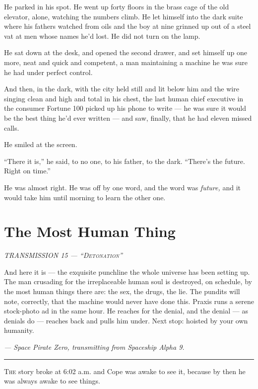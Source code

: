 \documentclass[11pt,openany]{book}
\newcommand{\transheader}{\normalfont\footnotesize\scshape\letterspace}
\newcommand{\letterspace}{}
\newenvironment{transmission}{%
  \par\vspace{0.3\baselineskip}\begin{center}\begin{minipage}{0.88\textwidth}%
  \itshape\small\setlength{\parindent}{0pt}\setstretch{1.06}}%
  {\end{minipage}\end{center}\vspace{0.4\baselineskip}%
  \noindent\hfil\rule{0.35\textwidth}{0.3pt}\hfil\par\vspace{1.0\baselineskip}}
\begin{document}
He parked in his spot. He went up forty floors in the brass cage of the old elevator, alone, watching the numbers climb. He let himself into the dark suite where his fathers watched from oils and the boy at nine grinned up out of a steel vat at men whose names he'd lost. He did not turn on the lamp.

He sat down at the desk, and opened the second drawer, and set himself up one more, neat and quick and competent, a man maintaining a machine he was sure he had under perfect control.

And then, in the dark, with the city held still and lit below him and the wire singing clean and high and total in his chest, the last human chief executive in the consumer Fortune 100 picked up his phone to write --- he was sure it would be the best thing he'd ever written --- and saw, finally, that he had eleven missed calls.

He smiled at the screen.

``There it is,'' he said, to no one, to his father, to the dark. ``There's the future. Right on time.''

He was almost right. He was off by one word, and the word was \textit{future,} and it would take him until morning to learn the other one.

\clearpage
\chapter{The Most Human Thing}

\begin{transmission}
{\transheader TRANSMISSION 15 --- ``Detonation''}\par\vspace{0.5em}
And here it is --- the exquisite punchline the whole universe has been setting up. The man crusading for the irreplaceable human soul is destroyed, on schedule, by the most human things there are: the sex, the drugs, the lie. The pundits will note, correctly, that the machine would never have done this. Praxis runs a serene stock-photo ad in the same hour. He reaches for the denial, and the denial --- as denials do --- reaches back and pulls him under. Next stop: hoisted by your own humanity.\par
\vspace{0.5em}\hfill\textit{--- Space Pirate Zero, transmitting from Spaceship Alpha 9.}\par
\end{transmission}


\lettrine[lines=3, lhang=0.05, nindent=0.25em]{T}{he} story broke at 6:02 a.m. and Cope was awake to see it, because by then he was always awake to see things.
\end{document}
